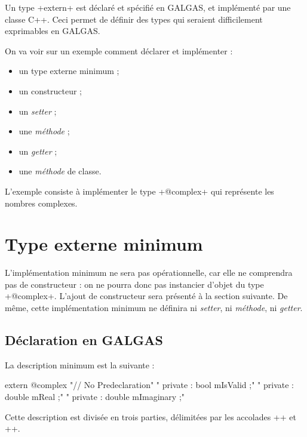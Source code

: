



Un type \ggsq+extern+ est déclaré et spécifié en GALGAS, et implémenté par une classe C++. Ceci permet de définir des types qui seraient difficilement exprimables en GALGAS.

On va voir sur un exemple comment déclarer et implémenter :
\begin{itemize}
  \item un type externe minimum ;
  \item un constructeur ;
  \item un \emph{setter} ;
  \item une \emph{méthode} ;
  \item un \emph{getter} ;
  \item une \emph{méthode} de classe.
\end{itemize}

L'exemple consiste à implémenter le type \ggsq+@complex+ qui représente les nombres complexes.

\section{Type externe minimum}

L'implémentation minimum ne sera pas opérationnelle, car elle ne comprendra pas de constructeur : on ne pourra donc pas instancier d'objet du type \ggsq+@complex+. L'ajout de constructeur sera présenté à la section suivante. De même, cette implémentation minimum ne définira ni \emph{setter}, ni \emph{méthode}, ni \emph{getter}.


\subsection{Déclaration en GALGAS}

La description minimum est la suivante :
\begin{galgas4}
extern @complex {
  "// No Predeclaration\n"
}{
  "  private : bool mIsValid ;\n"
  "  private : double mReal ;\n"
  "  private : double mImaginary ;\n"
}{
}
\end{galgas4}

Cette description est divisée en trois parties, délimitées par les accolades \ggsq+{+ et \ggsq+}+.

